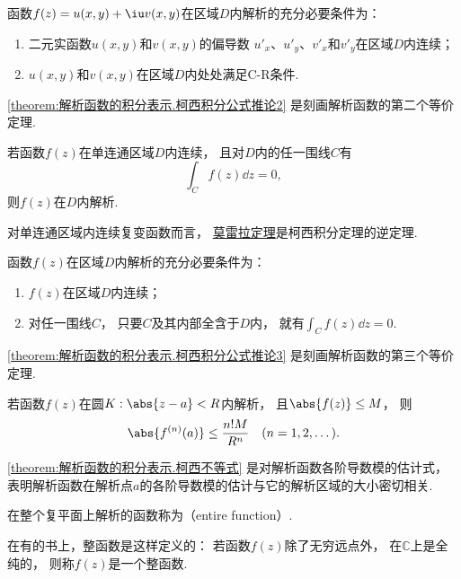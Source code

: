 \begin{corollary}\label{theorem:解析函数的积分表示.柯西积分公式推论2}
函数\(f(z)=u(x,y)+\iu v(x,y)\)在区域\(D\)内解析的充分必要条件为：
\begin{enumerate}
	\item 二元实函数\(u(x,y)\)和\(v(x,y)\)的偏导数
	\(u'_x\)、\(u'_y\)、\(v'_x\)和\(v'_y\)在区域\(D\)内连续；

	\item \(u(x,y)\)和\(v(x,y)\)在区域\(D\)内处处满足C-R条件.
\end{enumerate}
\end{corollary}
\cref{theorem:解析函数的积分表示.柯西积分公式推论2} 是刻画解析函数的第二个等价定理.

\begin{theorem}[莫雷拉定理]\label{theorem:解析函数的积分表示.莫雷拉定理}
若函数\(f(z)\)在单连通区域\(D\)内连续，
且对\(D\)内的任一围线\(C\)有\[
	\int_C f(z) \dd{z} = 0,
\]
则\(f(z)\)在\(D\)内解析.
\end{theorem}
对单连通区域内连续复变函数而言，
\hyperref[theorem:解析函数的积分表示.莫雷拉定理]{莫雷拉定理}是柯西积分定理的逆定理.

\begin{theorem}\label{theorem:解析函数的积分表示.柯西积分公式推论3}
函数\(f(z)\)在区域\(D\)内解析的充分必要条件为：
\begin{enumerate}
	\item \(f(z)\)在区域\(D\)内连续；

	\item 对任一围线\(C\)，
	只要\(C\)及其内部全含于\(D\)内，
	就有\(\int_C f(z) \dd{z} = 0\).
\end{enumerate}
\end{theorem}
\cref{theorem:解析函数的积分表示.柯西积分公式推论3} 是刻画解析函数的第三个等价定理.

\begin{theorem}[柯西不等式]
若函数\(f(z)\)在圆\(K: \abs{z-a}<R\)内解析，
且\(\abs{f(z)} \leq M\)，
则\begin{equation}\label{theorem:解析函数的积分表示.柯西不等式}
	\abs{f^{(n)}(a)} \leq \frac{n! M}{R^n}
	\quad(n=1,2,\dots).
\end{equation}
\end{theorem}
\cref{theorem:解析函数的积分表示.柯西不等式} 是对解析函数各阶导数模的估计式，
表明解析函数在解析点\(a\)的各阶导数模的估计与它的解析区域的大小密切相关.

\begin{definition}
在整个复平面上解析的函数称为（entire function）.
\end{definition}
在有的书上，整函数是这样定义的：
若函数\(f(z)\)除了无穷远点外，
在\(\mathbb{C}\)上是全纯的，
则称\(f(z)\)是一个整函数.

